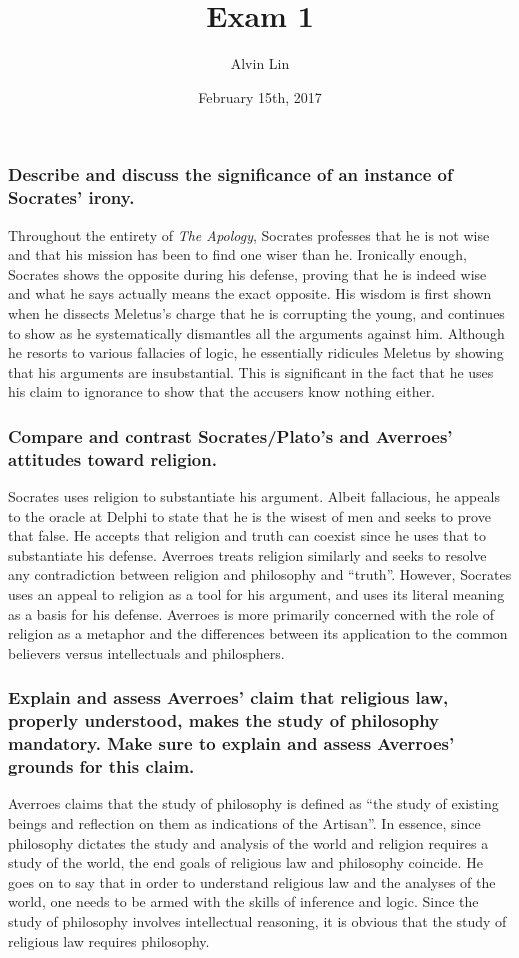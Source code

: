 \documentclass[letterpaper, 12pt]{article}
\title{Exam 1}
\author{Alvin Lin}
\date{February 15th, 2017}
\begin{document}
\maketitle

\subsubsection*{Describe and discuss the significance of an instance of
Socrates' irony.}
Throughout the entirety of \textit{The Apology}, Socrates professes that he is not wise and that his mission has been to find one wiser than he. Ironically enough, Socrates shows the opposite during his defense, proving that he is indeed wise and what he says actually means the exact opposite. His wisdom is first shown when he dissects Meletus's charge that he is corrupting the young, and continues to show as he systematically dismantles all the arguments against him. Although he resorts to various fallacies of logic, he essentially ridicules Meletus by showing that his arguments are insubstantial. This is significant in the fact that he uses his claim to ignorance to show that the accusers know nothing either.

\subsubsection*{Compare and contrast Socrates/Plato's and Averroes' attitudes
toward religion.}
Socrates uses religion to substantiate his argument. Albeit fallacious, he appeals to the oracle at Delphi to state that he is the wisest of men and seeks to prove that false. He accepts that religion and truth can coexist since he uses that to substantiate his defense. Averroes treats religion similarly and seeks to resolve any contradiction between religion and philosophy and ``truth''. However, Socrates uses an appeal to religion as a tool for his argument, and uses its literal meaning as a basis for his defense. Averroes is more primarily concerned with the role of religion as a metaphor and the differences between its application to the common believers versus intellectuals and philosphers.

\subsubsection*{Explain and assess Averroes' claim that religious law, properly
understood, makes the study of philosophy mandatory. Make sure to explain and
assess Averroes' grounds for this claim.}
Averroes claims that the study of philosophy is defined as ``the study of existing beings and reflection on them as indications of the Artisan''. In essence, since philosophy dictates the study and analysis of the world and religion requires a study of the world, the end goals of religious law and philosophy coincide. He goes on to say that in order to understand religious law and the analyses of the world, one needs to be armed with the skills of inference and logic. Since the study of philosophy involves intellectual reasoning, it is obvious that the study of religious law requires philosophy.
\end{document}

